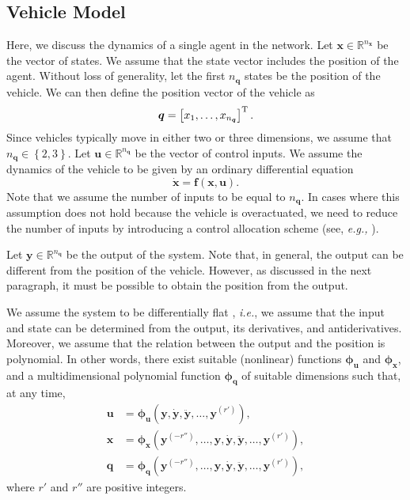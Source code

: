 \subsection{Vehicle Model}
\label{ssec:vehicle-model}



Here, we discuss the dynamics of a single agent in the network. Let $\bm{x} \in \mathbb{R}^{n_{\bm{x}}}$ be the vector of states.
We assume that the state vector includes the position of the agent.
Without loss of generality, let the first $n_{\bm{q}}$ states be the position of the vehicle.
We can then define the position vector of the vehicle as
\begin{equation}
    \bm{q} = \left[x_1, \ldots, x_{n_{\bm{q}}}\right]^{\mathrm{T}}.
\end{equation}
Since vehicles typically move in either two or three dimensions, we assume that $n_{\bm{q}} \in \left\{2,3\right\}$.
Let $\bm{u} \in \mathbb{R}^{n_{\bm{q}}}$ be the vector of control inputs.
We assume the dynamics of the vehicle to be given by an ordinary differential equation
\begin{equation}
    \dot{\bm{x}} = \bm{f} \left(\bm{x}, \bm{u}\right).
\label{equ:dynamics-of-an-agent}
\end{equation}
Note that we assume the number of inputs to be equal to $n_{\bm{q}}$.
In cases where this assumption does not hold because the vehicle is overactuated, we need to reduce the number of inputs by introducing a control allocation scheme (see, \emph{e.g.,} \cite{johansen_control_2013}).

Let $\bm{y} \in \mathbb{R}^{n_{\bm{q}}}$ be the output of the system.
Note that, in general, the output can be different from the position of the vehicle.
However, as discussed in the next paragraph, it must be possible to obtain the position from the output.

We assume the system to be differentially flat \cite{fliess_1995_flatness}, \emph{i.e.}, we assume that the input and state can be determined from the output, its derivatives, and antiderivatives. Moreover, we assume that the relation between the output and the position is polynomial.
In other words, there exist suitable (nonlinear) functions $\bm{\phi}_{\bm{u}}$ and $\bm{\phi}_{\bm{x}}$, and a multidimensional polynomial function $\bm{\phi}_{\bm{q}}$ of suitable dimensions such that, at any time,
%
\begin{align}
    \bm{u} &= \bm{\phi}_{\bm{u}} \left(\bm{y}, \dot{\bm{y}}, \ddot{\bm{y}}, \ldots, \bm{y}^{(r')}\right), \label{eq:phi_u} \\
    \bm{x} &= \bm{\phi}_{\bm{x}} \left(\bm{y}^{(-r'')}, \ldots, \bm{y}, \dot{\bm{y}}, \ddot{\bm{y}}, \ldots, \bm{y}^{(r')}\right), \label{eq:phi_x} \\ 
    \bm{q} &= \bm{\phi}_{\bm{q}} \left(\bm{y}^{(-r'')}, \ldots, \bm{y}, \dot{\bm{y}}, \ddot{\bm{y}}, \ldots, \bm{y}^{(r')}\right), \label{eq:phi_q}
\end{align}
%
where $r'$ and $r''$ are positive integers.

